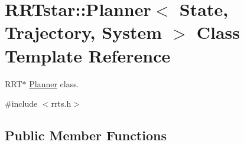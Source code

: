 \hypertarget{class_r_r_tstar_1_1_planner}{\section{R\-R\-Tstar\-:\-:Planner$<$ State, Trajectory, System $>$ Class Template Reference}
\label{class_r_r_tstar_1_1_planner}
}


R\-R\-T$\ast$ \hyperlink{class_r_r_tstar_1_1_planner}{Planner} class.  




{\ttfamily \#include $<$rrts.\-h$>$}

\subsection*{Public Member Functions}
